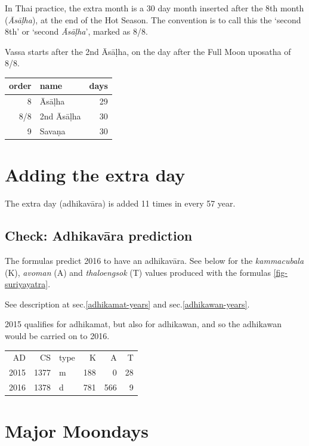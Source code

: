 \documentclass[11pt,oneside]{memoir-article}
\begin{document}
In Thai practice, the extra month is a 30 day month inserted after the
8th month (\emph{Āsāḷha}), at the end of the Hot Season. The convention is
to call this the `second 8th' or `second \emph{Āsāḷha}', marked as 8/8.

Vassa starts after the 2nd Āsāḷha, on the day after the Full Moon
uposatha of 8/8.

\begin{center}
\begin{tabular}{rlr}
order & name & days\\
\hline
8 & Āsāḷha & 29\\
8/8 & 2nd Āsāḷha & 30\\
9 & Savaṇa & 30\\
\end{tabular}
\end{center}
\section{Adding the extra day}
\label{sec-1-3}
\label{adding-extra-day}

The extra day (adhikavāra) is added 11 times in every 57 year.

\subsection{Check: Adhikavāra prediction}
\label{sec-1-3-1}
\label{adhikavara-prediction}

The formulas predict 2016 to have an adhikavāra. See below for the
\emph{kammacubala} (K), \emph{avoman} (A) and \emph{thaloengsok} (T) values produced
with the formulas \ref{fig-suriyayatra}.

See description at sec.\ref{adhikamat-years} and
sec.\ref{adhikawan-years}.

2015 qualifies for adhikamat, but also for adhikawan, and so the
adhikawan would be carried on to 2016.

\begin{center}
\begin{tabular}{rrlrrr}
AD & CS & type & K & A & T\\
2015 & 1377 & m & 188 & 0 & 28\\
2016 & 1378 & d & 781 & 566 & 9\\
\end{tabular}
\end{center}

\section{Major Moondays}
\label{sec-1-4}
\end{document}
